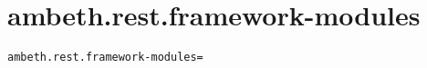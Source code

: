 \section{ambeth.rest.framework-modules}
\label{configuration:AmbethRestFrameworkModules}
\ClearAPI
\TODO%
\begin{lstlisting}[style=Props,caption={Usage example for \textit{ambeth.rest.framework-modules}}]
ambeth.rest.framework-modules=
\end{lstlisting}